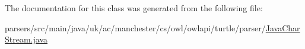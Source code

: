 The documentation for this class was generated from the following file\-:\begin{DoxyCompactItemize}
\item 
parsers/src/main/java/uk/ac/manchester/cs/owl/owlapi/turtle/parser/\hyperlink{uk_2ac_2manchester_2cs_2owl_2owlapi_2turtle_2parser_2_java_char_stream_8java}{Java\-Char\-Stream.\-java}\end{DoxyCompactItemize}
